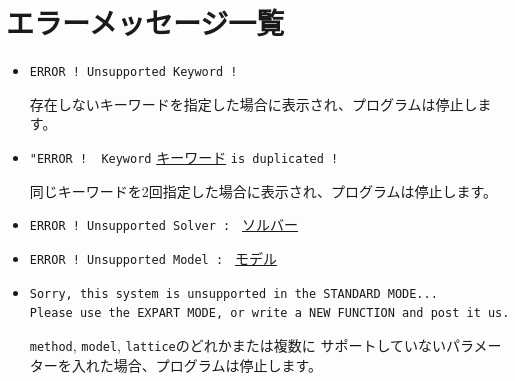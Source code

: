 \newpage
\section{エラーメッセージ一覧}

\begin{itemize}
\item \verb|ERROR ! Unsupported Keyword !|

存在しないキーワードを指定した場合に表示され、プログラムは停止します。

\item \verb|"ERROR !  Keyword| \underline{キーワード} \verb|is duplicated !|

同じキーワードを2回指定した場合に表示され、プログラムは停止します。

\item \verb|ERROR ! Unsupported Solver : | \underline{ソルバー} \vspace{-0.3cm}
\item \verb|ERROR ! Unsupported Model : | \underline{モデル} \vspace{-0.3cm}
\item \verb|Sorry, this system is unsupported in the STANDARD MODE...| \\
  \verb|Please use the EXPART MODE, or write a NEW FUNCTION and post it us.|

\verb|method|, \verb|model|, \verb|lattice|のどれかまたは複数に
サポートしていないパラメーターを入れた場合、プログラムは停止します。


\end{itemize}
